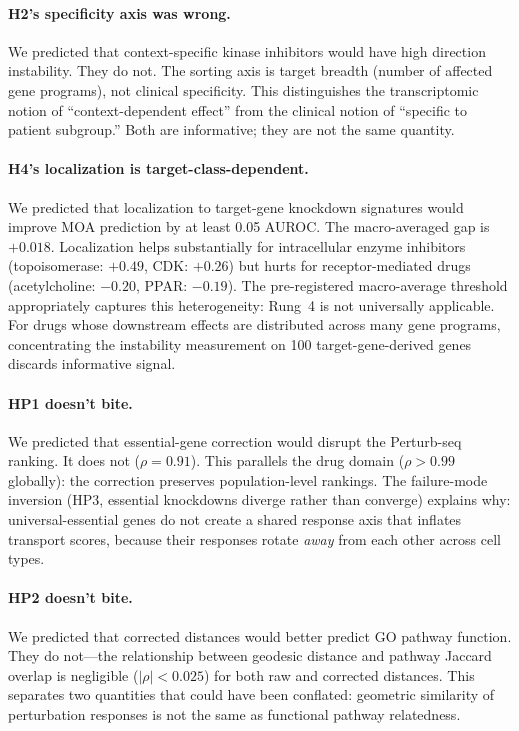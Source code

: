 \documentclass{article}
\begin{document}
\paragraph{H2's specificity axis was wrong.}
We predicted that context-specific kinase inhibitors would have high direction
instability. They do not. The sorting axis is target breadth (number of
affected gene programs), not clinical specificity. This distinguishes the
transcriptomic notion of ``context-dependent effect'' from the clinical notion
of ``specific to patient subgroup.'' Both are informative; they are not the
same quantity.

\paragraph{H4's localization is target-class-dependent.}
We predicted that localization to target-gene knockdown signatures would
improve MOA prediction by at least 0.05 AUROC. The macro-averaged gap is
$+0.018$. Localization helps substantially for intracellular enzyme
inhibitors (topoisomerase: $+0.49$, CDK: $+0.26$) but hurts for
receptor-mediated drugs (acetylcholine: $-0.20$, PPAR: $-0.19$). The
pre-registered macro-average threshold appropriately captures this
heterogeneity: Rung~4 is not universally applicable. For drugs whose
downstream effects are distributed across many gene programs, concentrating
the instability measurement on 100 target-gene-derived genes discards
informative signal.

\paragraph{HP1 doesn't bite.}
We predicted that essential-gene correction would disrupt the Perturb-seq
ranking. It does not ($\rho = 0.91$). This parallels the drug domain ($\rho
> 0.99$ globally): the correction preserves population-level rankings. The
failure-mode inversion
(HP3, essential knockdowns diverge rather than converge) explains why:
universal-essential genes do not create a shared response axis that inflates
transport scores, because their responses rotate \emph{away} from each other
across cell types.

\paragraph{HP2 doesn't bite.}
We predicted that corrected distances would better predict GO pathway
function. They do not---the relationship between geodesic distance and
pathway Jaccard overlap is negligible ($|\rho| < 0.025$) for both raw and
corrected distances. This separates two quantities that could have been
conflated: geometric similarity of perturbation responses is not the same as
functional pathway relatedness.
\end{document}
